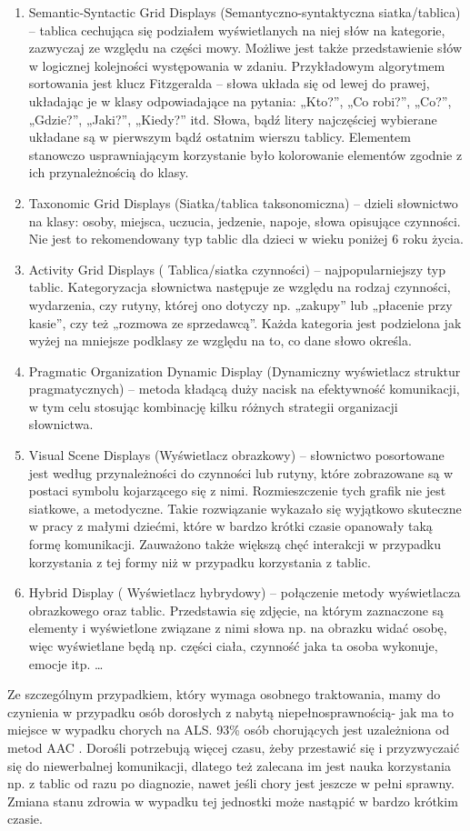 \documentclass[twoside,a4paper]{book}
\begin{document}
\begin{enumerate}
\item Semantic-Syntactic Grid Displays (Semantyczno-syntaktyczna siatka/tablica) – tablica cechująca się podziałem wyświetlanych na niej słów na kategorie, zazwyczaj ze względu na części mowy. Możliwe jest także przedstawienie słów w logicznej kolejności występowania w zdaniu. Przykładowym algorytmem sortowania jest klucz Fitzgeralda – słowa układa się od lewej do prawej, układając je w klasy odpowiadające na pytania: „Kto?”, „Co robi?”, „Co?”, „Gdzie?”, „Jaki?”, „Kiedy?” itd.  Słowa, bądź litery najczęściej wybierane układane są w pierwszym bądź ostatnim wierszu tablicy. Elementem stanowczo usprawniającym korzystanie było kolorowanie elementów zgodnie z ich przynależnością do  klasy. 
\item Taxonomic Grid Displays (Siatka/tablica taksonomiczna) – dzieli słownictwo na klasy: osoby, miejsca, uczucia, jedzenie, napoje, słowa opisujące czynności. Nie jest to rekomendowany typ tablic dla dzieci w wieku poniżej 6 roku życia. 
\item Activity Grid Displays ( Tablica/siatka czynności) – najpopularniejszy typ tablic. Kategoryzacja słownictwa następuje ze względu na rodzaj czynności, wydarzenia, czy rutyny, której ono dotyczy np. „zakupy” lub „płacenie przy kasie”, czy też „rozmowa ze sprzedawcą”. Każda kategoria jest podzielona jak wyżej na mniejsze podklasy ze względu na to, co dane słowo określa. 
\item Pragmatic Organization Dynamic Display (Dynamiczny wyświetlacz  struktur pragmatycznych) – metoda kładącą duży nacisk na efektywność komunikacji, w tym celu stosując kombinację kilku różnych strategii organizacji słownictwa. 
\item Visual Scene Displays (Wyświetlacz obrazkowy) – słownictwo posortowane jest według przynależności do czynności lub rutyny, które zobrazowane są w postaci  symbolu kojarzącego się z nimi. Rozmieszczenie tych grafik nie jest siatkowe, a metodyczne. Takie rozwiązanie wykazało się wyjątkowo skuteczne w pracy z małymi dziećmi, które w bardzo krótki czasie opanowały taką formę komunikacji.  Zauważono także większą chęć interakcji w przypadku korzystania z tej formy niż w przypadku korzystania z tablic. 
\item Hybrid Display ( Wyświetlacz hybrydowy) – połączenie metody wyświetlacza obrazkowego oraz tablic. Przedstawia się zdjęcie,  na którym zaznaczone są elementy i wyświetlone związane z nimi słowa np. na obrazku widać osobę, więc wyświetlane będą np. części ciała, czynność jaka ta osoba wykonuje, emocje itp. 
 \ldots
\end{enumerate}
Ze szczególnym przypadkiem, który wymaga osobnego traktowania, mamy do czynienia w przypadku osób dorosłych z nabytą niepełnosprawnością- jak ma to miejsce w wypadku chorych na ALS. 93\% osób chorujących jest uzależniona od metod AAC .  Dorośli potrzebują więcej czasu, żeby przestawić się i przyzwyczaić się do niewerbalnej komunikacji, dlatego też zalecana im jest nauka korzystania np. z tablic od razu po diagnozie, nawet jeśli chory jest jeszcze w pełni sprawny. Zmiana stanu zdrowia w wypadku tej jednostki może nastąpić w bardzo krótkim czasie.   
\end{document}
